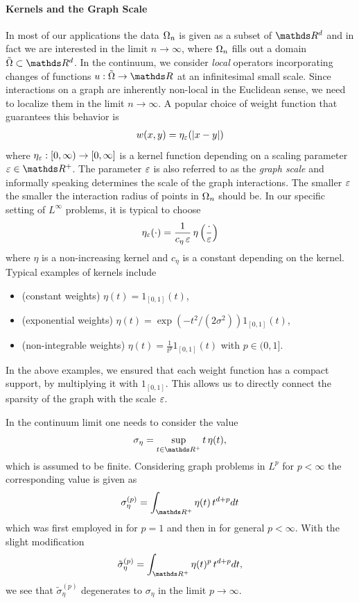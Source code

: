 \paragraph{Kernels and the Graph Scale} In most of our applications the data $\Omega_n$ is given as a subset of $\R^d$ and in fact we are interested in the limit $n\to\infty$, where $\Omega_n$ fills out a domain $\tilde\domain\subset\R^d$. In the continuum, we consider \emph{local} operators incorporating changes of functions $u:\tilde\domain\to\R$ at an infinitesimal small scale. Since interactions on a graph are inherently non-local in the Euclidean sense, we need to localize them in the limit $n\to\infty$. A popular choice of weight function that guarantees this behavior is
%
\begin{align*}
w(x,y) = \eta_{\varepsilon}(\left|x-y\right|)
\end{align*}
%
where $\eta_\varepsilon:[0,\infty)\to [0,\infty]$ is a kernel function depending on a scaling parameter $\gscale\in\R^+$. The parameter $\varepsilon$ is also referred to as the \emph{graph scale} and informally speaking determines the scale of the graph interactions. The smaller $\varepsilon$ the smaller the interaction radius of points in $\Omega_n$ should be. In our specific setting of $L^\infty$ problems, it is typical to choose
%
\begin{align*}
\eta_\varepsilon(\cdot) = \frac{1}{c_\eta\, \varepsilon}\, \eta\left(\frac{\cdot}{\varepsilon}\right)
\end{align*}
%
where $\eta$ is a non-increasing kernel and $c_\eta$ is a constant depending on the kernel. Typical examples of kernels include
%
\begin{itemize}
\item (constant weights) $\eta(t)=1_{[0,1]}(t)$,
\item (exponential weights) $\eta(t)=\exp(-t^2/(2\sigma^2))1_{[0,1]}(t)$,
\item (non-integrable weights) $\eta(t)=\frac{1}{t^p}1_{[0,1]}(t)$ with $p\in(0,1]$.
\end{itemize}
%
In the above examples, we ensured that each weight function has a compact support, by multiplying it with $1_{[0,1]}$. This allows us to directly connect the sparsity of the graph with the scale $\varepsilon$.
%
%
\begin{remark}{}{}
In the continuum limit one needs to consider the value 
%
\begin{align*}
\sigma_\eta = \sup_{t\in\R^+} t\, \eta(t),
\end{align*}
%
which is assumed to be finite. Considering graph problems in $L^p$ for $p<\infty$
the corresponding value is given as
%
\begin{align}\label{eq:kernelconst}
\sigma_\eta^{(p)} = \int_{\R^+} \eta(t)\, t^{d+p} dt
\end{align}
%
which was first employed in \cite{GarcSlep15} for $p=1$ and then in \cite{slepcev2019analysis} for general $p<\infty$. With the slight modification
%
\begin{align*}
\tilde\sigma_\eta^{(p)} = 
\int_{\R^+} \eta(t)^p\, t^{d+p} dt,
\end{align*}
%
we see that $\tilde\sigma_\eta^{(p)}$ degenerates to $\sigma_\eta$ in the limit $p\to\infty$.
\end{remark}

